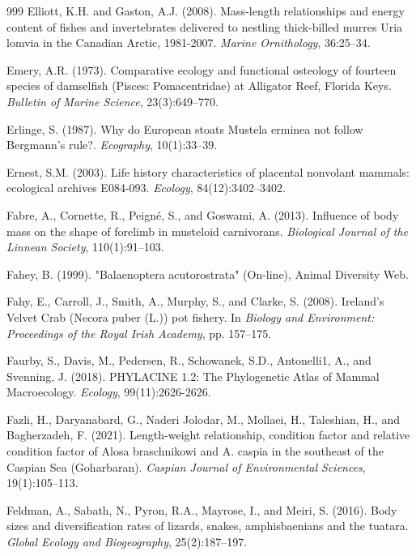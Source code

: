 \begin{thebibliography}{999}
Elliott, K.H. and Gaston, A.J. (2008). Mass-length relationships and energy content of fishes and invertebrates delivered to nestling thick-billed murres Uria lomvia in the Canadian Arctic, 1981-2007. \textit{Marine Ornithology}, 36:25--34.

Emery, A.R. (1973). Comparative ecology and functional osteology of fourteen species of damselfish (Pisces: Pomacentridae) at Alligator Reef, Florida Keys. \textit{Bulletin of Marine Science}, 23(3):649--770.

Erlinge, S. (1987). Why do European stoats Mustela erminea not follow Bergmann's rule?. \textit{Ecography}, 10(1):33--39.

Ernest, S.M. (2003). Life history characteristics of placental nonvolant mammals: ecological archives E084-093. \textit{Ecology}, 84(12):3402--3402.

Fabre, A., Cornette, R., Peign{\'e}, S., and Goswami, A. (2013). Influence of body mass on the shape of forelimb in musteloid carnivorans. \textit{Biological Journal of the Linnean Society}, 110(1):91--103.

Fahey, B. (1999). "Balaenoptera acutorostrata" (On-line), {Animal Diversity Web}.

Fahy, E., Carroll, J., Smith, A., Murphy, S., and Clarke, S. (2008). Ireland's Velvet Crab (Necora puber (L.)) pot fishery. In \textit{Biology and Environment: Proceedings of the Royal Irish Academy}, pp. 157--175.

Faurby, S., Davis, M., Pedersen, R., Schowanek, S.D., Antonelli1, A., and Svenning, J. (2018). PHYLACINE 1.2: The Phylogenetic Atlas of Mammal Macroecology. \textit{Ecology}, 99(11):2626-2626.

Fazli, H., Daryanabard, G., Naderi Jolodar, M., Mollaei, H., Taleshian, H., and Bagherzadeh, F. (2021). Length-weight relationship, condition factor and relative condition factor of Alosa braschnikowi and A. caspia in the southeast of the Caspian Sea (Goharbaran). \textit{Caspian Journal of Environmental Sciences}, 19(1):105--113.

Feldman, A., Sabath, N., Pyron, R.A., Mayrose, I., and Meiri, S. (2016). Body sizes and diversification rates of lizards, snakes, amphisbaenians and the tuatara. \textit{Global Ecology and Biogeography}, 25(2):187--197.


\end{thebibliography}
